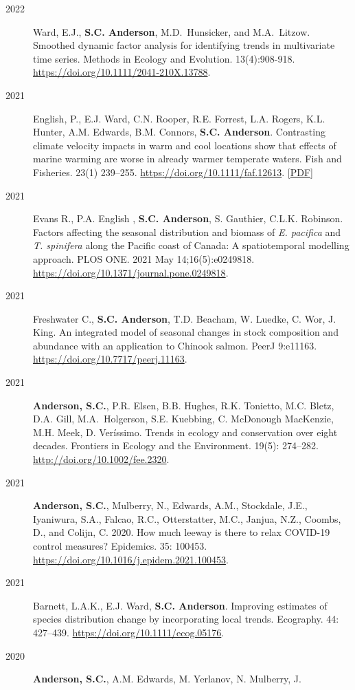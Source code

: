 \begin{description}
\item[2022]
Ward, E.J., \textbf{S.C. Anderson}, M.D.\ Hunsicker, and M.A.\ Litzow.
Smoothed dynamic factor analysis for identifying trends in multivariate
time series. Methods in Ecology and Evolution. 13(4):908-918.
\url{https://doi.org/10.1111/2041-210X.13788}.
\item[2021]
English, P., E.J. Ward, C.N. Rooper, R.E. Forrest, L.A. Rogers, K.L.
Hunter, A.M. Edwards, B.M. Connors, \textbf{S.C. Anderson}. Contrasting
climate velocity impacts in warm and cool locations show that effects of
marine warming are worse in already warmer temperate waters. Fish and
Fisheries. 23(1) 239--255. \url{https://doi.org/10.1111/faf.12613}.
{[}\href{https://www.dropbox.com/s/cmkzlxgiez6rzc0/English_etal_2022_contrasting_climate_velocity.pdf?dl=1}{PDF}{]}
\item[2021]
Evans R., P.A. English , \textbf{S.C. Anderson}, S. Gauthier, C.L.K.
Robinson. Factors affecting the seasonal distribution and biomass of
\emph{E. pacifica} and \emph{T. spinifera} along the Pacific coast of
Canada: A spatiotemporal modelling approach. PLOS ONE. 2021 May
14;16(5):e0249818. \url{https://doi.org/10.1371/journal.pone.0249818}.
\item[2021]
Freshwater C., \textbf{S.C. Anderson}, T.D. Beacham, W. Luedke, C. Wor,
J. King. An integrated model of seasonal changes in stock composition
and abundance with an application to Chinook salmon. PeerJ 9:e11163.
\url{https://doi.org/10.7717/peerj.11163}.
\item[2021]
\textbf{Anderson, S.C.}, P.R. Elsen, B.B. Hughes, R.K. Tonietto, M.C.
Bletz, D.A. Gill, M.A.\ Holgerson, S.E. Kuebbing, C. McDonough MacKenzie,
M.H. Meek, D. Veríssimo. Trends in ecology and conservation over eight
decades. Frontiers in Ecology and the Environment. 19(5): 274--282.
\url{http://doi.org/10.1002/fee.2320}.
\item[2021]
\textbf{Anderson, S.C.}, Mulberry, N., Edwards, A.M., Stockdale, J.E.,
Iyaniwura, S.A., Falcao, R.C., Otterstatter, M.C., Janjua, N.Z., Coombs,
D., and Colijn, C. 2020. How much leeway is there to relax COVID-19
control measures? Epidemics. 35: 100453.
\url{https://doi.org/10.1016/j.epidem.2021.100453}.
\item[2021]
Barnett, L.A.K., E.J. Ward, \textbf{S.C. Anderson}. Improving estimates
of species distribution change by incorporating local trends. Ecography.
44: 427--439. \url{https://doi.org/10.1111/ecog.05176}.
\item[2020]
\textbf{Anderson, S.C.}, A.M. Edwards, M. Yerlanov, N. Mulberry, J.

\end{description}

